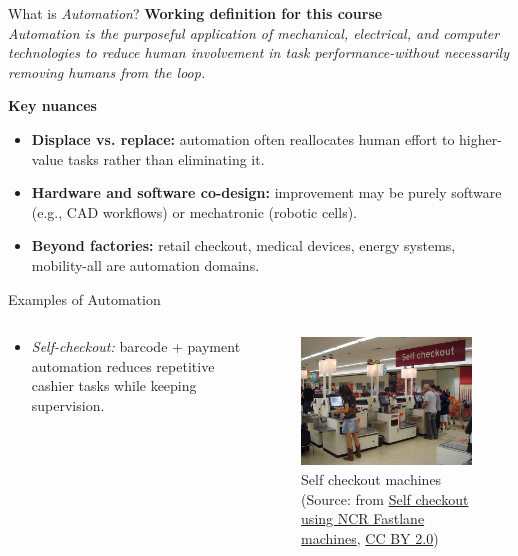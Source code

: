 \begin{frame}{What is \textit{Automation}?}
\textbf{Working definition for this course}\\[2mm]
\emph{Automation is the purposeful application of mechanical, electrical, and computer technologies to reduce human involvement in task performance-without necessarily removing humans from the loop.}

\vspace{2mm}
\textbf{Key nuances}
\begin{itemize}
  \item \textbf{Displace vs. replace:} automation often reallocates human effort to higher-value tasks rather than eliminating it.
  \item \textbf{Hardware and software co-design:} improvement may be purely software (e.g., CAD workflows) or mechatronic (robotic cells).
  \item \textbf{Beyond factories:} retail checkout, medical devices, energy systems, mobility-all are automation domains.
\end{itemize}

\end{frame}

\begin{frame}{Examples of Automation}
	\begin{columns}
		\begin{column}{0.25\textwidth}
			\begin{itemize}
  				\item \emph{Self-checkout:} barcode + payment automation reduces repetitive cashier tasks while keeping supervision.
			\end{itemize}
		\end{column}
		\begin{column}{0.75\textwidth}
				\begin{figure}
				\centering
				\includegraphics[width=0.7\linewidth]{fig/lec01/Self_checkout.jpg}
				\caption*{Self checkout machines (Source: from \href{https://commons.wikimedia.org/wiki/File:Self_checkout_using_NCR_Fastlane_machines.jpg}{Self checkout using NCR Fastlane machines}, \href{https://creativecommons.org/licenses/by/2.0/deed.en}{CC BY 2.0})}
			\end{figure}
		\end{column}
\end{columns}
\end{frame}

